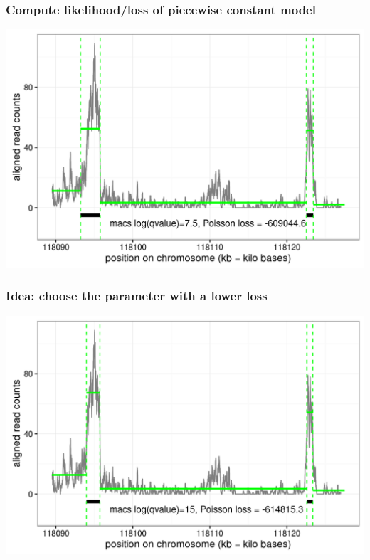 \documentclass{beamer}
\DeclareMathOperator*{\PoissonLoss}{PoissonLoss}
\newcommand{\RR}{\mathbb R}
\newcommand{\ZZ}{\mathbb Z}
\begin{document}
\begin{frame}
  \frametitle{Compute likelihood/loss of piecewise constant model}
  \includegraphics[width=1\textwidth]{figure-macs-problem-7-5.png}
\end{frame}

\begin{frame}
  \frametitle{Idea: choose the parameter with a lower loss}
  \includegraphics[width=1\textwidth]{figure-macs-problem-15.png}
\end{frame}
\end{document}
